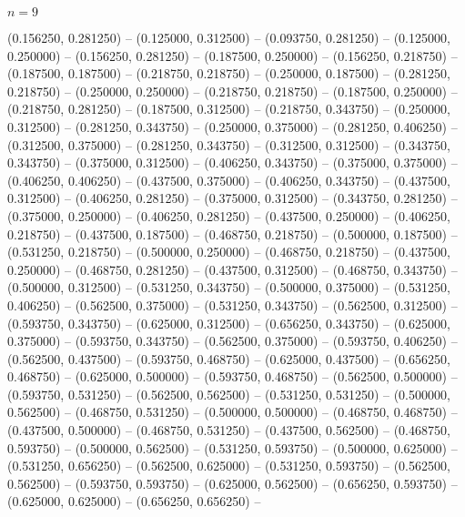 \begin{zzfrac}{$n = 9$}
\begin{scope}[shift={(0,0.5)}]
  (0.156250, 0.281250)   --
  (0.125000, 0.312500)   --
  (0.093750, 0.281250)   --
  (0.125000, 0.250000)   --
  (0.156250, 0.281250)   --
  (0.187500, 0.250000)   --
  (0.156250, 0.218750)   --
  (0.187500, 0.187500)   --
  (0.218750, 0.218750)   --
  (0.250000, 0.187500)   --
  (0.281250, 0.218750)   --
  (0.250000, 0.250000)   --
  (0.218750, 0.218750)   --
  (0.187500, 0.250000)   --
  (0.218750, 0.281250)   --
  (0.187500, 0.312500)   --
  (0.218750, 0.343750)   --
  (0.250000, 0.312500)   --
  (0.281250, 0.343750)   --
  (0.250000, 0.375000)   --
  (0.281250, 0.406250)   --
  (0.312500, 0.375000)   --
  (0.281250, 0.343750)   --
  (0.312500, 0.312500)   --
  (0.343750, 0.343750)   --
  (0.375000, 0.312500)   --
  (0.406250, 0.343750)   --
  (0.375000, 0.375000)   --
  (0.406250, 0.406250)   --
  (0.437500, 0.375000)   --
  (0.406250, 0.343750)   --
  (0.437500, 0.312500)   --
  (0.406250, 0.281250)   --
  (0.375000, 0.312500)   --
  (0.343750, 0.281250)   --
  (0.375000, 0.250000)   --
  (0.406250, 0.281250)   --
  (0.437500, 0.250000)   --
  (0.406250, 0.218750)   --
  (0.437500, 0.187500)   --
  (0.468750, 0.218750)   --
  (0.500000, 0.187500)   --
  (0.531250, 0.218750)   --
  (0.500000, 0.250000)   --
  (0.468750, 0.218750)   --
  (0.437500, 0.250000)   --
  (0.468750, 0.281250)   --
  (0.437500, 0.312500)   --
  (0.468750, 0.343750)   --
  (0.500000, 0.312500)   --
  (0.531250, 0.343750)   --
  (0.500000, 0.375000)   --
  (0.531250, 0.406250)   --
  (0.562500, 0.375000)   --
  (0.531250, 0.343750)   --
  (0.562500, 0.312500)   --
  (0.593750, 0.343750)   --
  (0.625000, 0.312500)   --
  (0.656250, 0.343750)   --
  (0.625000, 0.375000)   --
  (0.593750, 0.343750)   --
  (0.562500, 0.375000)   --
  (0.593750, 0.406250)   --
  (0.562500, 0.437500)   --
  (0.593750, 0.468750)   --
  (0.625000, 0.437500)   --
  (0.656250, 0.468750)   --
  (0.625000, 0.500000)   --
  (0.593750, 0.468750)   --
  (0.562500, 0.500000)   --
  (0.593750, 0.531250)   --
  (0.562500, 0.562500)   --
  (0.531250, 0.531250)   --
  (0.500000, 0.562500)   --
  (0.468750, 0.531250)   --
  (0.500000, 0.500000)   --
  (0.468750, 0.468750)   --
  (0.437500, 0.500000)   --
  (0.468750, 0.531250)   --
  (0.437500, 0.562500)   --
  (0.468750, 0.593750)   --
  (0.500000, 0.562500)   --
  (0.531250, 0.593750)   --
  (0.500000, 0.625000)   --
  (0.531250, 0.656250)   --
  (0.562500, 0.625000)   --
  (0.531250, 0.593750)   --
  (0.562500, 0.562500)   --
  (0.593750, 0.593750)   --
  (0.625000, 0.562500)   --
  (0.656250, 0.593750)   --
  (0.625000, 0.625000)   --
  (0.656250, 0.656250)   --

\end{scope}
\end{zzfrac}

